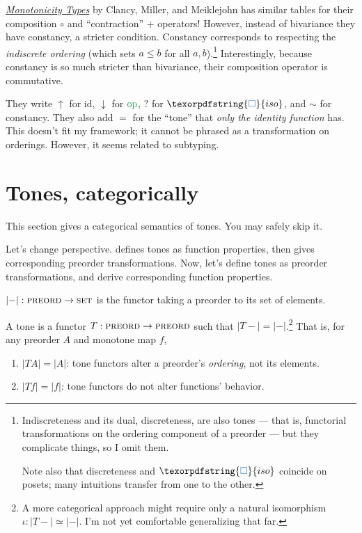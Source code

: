 \documentclass{rntz}
\newcommand{\cat}[1]{\textsc{#1}} %
\newcommand{\Pre}{\cat{preord}}
\newcommand{\Set}{\cat{set}}
\newcommand\isoto{\simeq}
\newcommand\opcolor{\color{ForestGreen}}
\newcommand\isocolor{\color{NavyBlue}}
\newcommand\id{\ensuremath{\mathrm{id}}}
\newcommand\op{\ensuremath{\mathrm{\opcolor op}}}
\newcommand\iso{\texorpdfstring{\ensuremath{{\isocolor\Box}}}{iso}}
\begin{document}
\href{https://infoscience.epfl.ch/record/231867/files/monotonicity-types.pdf}{\emph{Monotonicity
    Types}} by Clancy, Miller, and Meiklejohn has similar tables for their
composition $\circ$ and ``contraction'' $+$ operators! However, instead of
bivariance they have constancy, a stricter condition.
%
Constancy corresponds to respecting the \emph{indiscrete ordering} (which sets
$a \le b$ for all $a,b$).\footnote{Indiscreteness and its dual, discreteness,
  are also tones --- that is, functorial transformations on the ordering
  component of a preorder --- but they complicate things, so I omit them.

  Note also that discreteness and $\iso$ coincide on posets; many intuitions
  transfer from one to the other.}
%
Interestingly, because constancy is so much stricter than bivariance, their
composition operator is commutative.

They write $\uparrow$ for $\id$, $\downarrow$ for $\op$, $?$ for $\iso$, and
$\sim$ for constancy. They also add $=$ for the ``tone'' that \emph{only the
  identity function} has. This doesn't fit my framework; it cannot be phrased as
a transformation on orderings. However, it seems related to subtyping.



\section{Tones, categorically}

\newcommand{\elems}[1]{\ensuremath{|{#1}|}}
\newcommand{\elemsfn}[0]{\elems{-}}


This section gives a categorical semantics of tones. You may safely skip it.

Let's change perspective.  defines tones as function
pro\-per\-ties, then gives corresponding pre\-order trans\-form\-ations. Now,
let's define tones as preorder transformations, and derive corresponding
function properties.

\begin{definition}
  $\elemsfn : \Pre \to \Set$ is the functor taking a preorder to its set of
  elements.
\end{definition}

\begin{definition}[Tones]\label{def:tone}
  A tone is a functor $T : \Pre \to \Pre$ such that $\elems{T-} =
  \elemsfn$.\footnote{A more categorical approach might require only a natural
    isomorphism \(\iota : \elems{T-} \isoto \elemsfn\). I'm not yet comfortable
    generalizing that far.} That is, for any preorder $A$ and monotone map $f$,
  \begin{enumerate}
  \item $\elems{TA} = \elems{A}$: tone functors alter a preorder's
    \emph{ordering}, not its elements.
  \item $\elems{Tf} = \elems{f}$: tone functors do not alter functions'
    behavior.
  \end{enumerate}
\end{definition}
\end{document}

